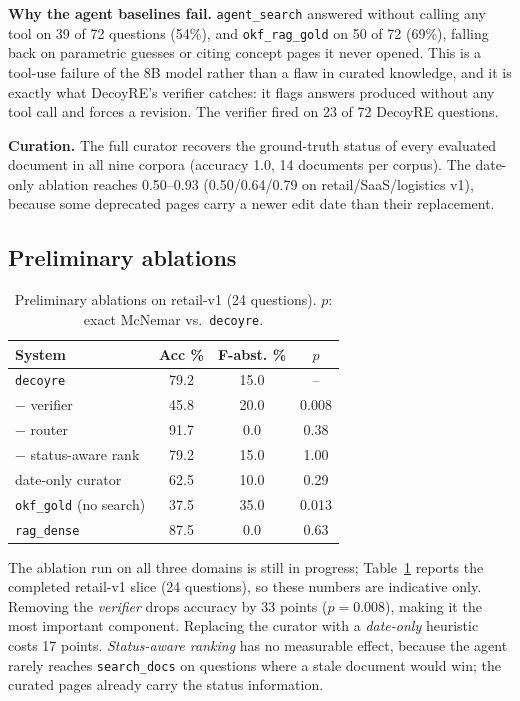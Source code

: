 \documentclass[conference]{IEEEtran}
\newcommand{\sys}[1]{\texttt{#1}}
\begin{document}
\textbf{Why the agent baselines fail.} \sys{agent\_search} answered without calling any tool on 39 of 72
questions (54\%), and \sys{okf\_rag\_gold} on 50 of 72 (69\%), falling back on parametric guesses or citing concept
pages it never opened. This is a tool-use failure of the 8B model rather than a flaw in curated knowledge, and it is
exactly what DecoyRE's verifier catches: it flags answers produced without any tool call and forces a revision. The
verifier fired on 23 of 72 DecoyRE questions.

\textbf{Curation.} The full curator recovers the ground-truth status of every evaluated document in all nine
corpora (accuracy 1.0, 14 documents per corpus). The date-only ablation reaches 0.50--0.93 (0.50/0.64/0.79 on
retail/SaaS/logistics v1), because some deprecated pages carry a newer edit date than their replacement.

\subsection{Preliminary ablations}

\begin{table}[t]
\caption{Preliminary ablations on retail-v1 (24 questions). $p$: exact McNemar vs.\ \sys{decoyre}.}
\label{tab:abl}
\centering
\small
\begin{tabular}{@{}lccc@{}}
\toprule
System & Acc \% & F-abst. \% & $p$ \\
\midrule
\sys{decoyre}               & 79.2 & 15.0 & -- \\
\quad $-$ verifier          & 45.8 & 20.0 & 0.008 \\
\quad $-$ router            & 91.7 & 0.0  & 0.38 \\
\quad $-$ status-aware rank & 79.2 & 15.0 & 1.00 \\
\quad date-only curator     & 62.5 & 10.0 & 0.29 \\
\sys{okf\_gold} (no search) & 37.5 & 35.0 & 0.013 \\
\midrule
\sys{rag\_dense}            & 87.5 & 0.0  & 0.63 \\
\bottomrule
\end{tabular}
\end{table}

The ablation run on all three domains is still in progress; Table~\ref{tab:abl} reports the completed retail-v1 slice
(24 questions), so these numbers are indicative only.
Removing the \emph{verifier} drops accuracy by 33 points ($p=0.008$), making it the most important component.
Replacing the curator with a \emph{date-only} heuristic costs 17 points. \emph{Status-aware ranking} has no measurable
effect, because the agent rarely reaches \sys{search\_docs} on questions where a stale document would win; the curated
pages already carry the status information.
\end{document}
